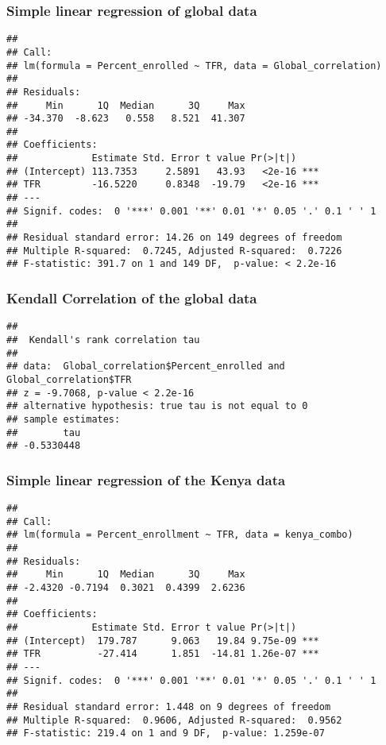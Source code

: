 \documentclass[11pt,]{article}
\begin{document}
\subsubsection{Simple linear regression of global
data}\label{simple-linear-regression-of-global-data-1}

\begin{verbatim}
## 
## Call:
## lm(formula = Percent_enrolled ~ TFR, data = Global_correlation)
## 
## Residuals:
##     Min      1Q  Median      3Q     Max 
## -34.370  -8.623   0.558   8.521  41.307 
## 
## Coefficients:
##             Estimate Std. Error t value Pr(>|t|)    
## (Intercept) 113.7353     2.5891   43.93   <2e-16 ***
## TFR         -16.5220     0.8348  -19.79   <2e-16 ***
## ---
## Signif. codes:  0 '***' 0.001 '**' 0.01 '*' 0.05 '.' 0.1 ' ' 1
## 
## Residual standard error: 14.26 on 149 degrees of freedom
## Multiple R-squared:  0.7245, Adjusted R-squared:  0.7226 
## F-statistic: 391.7 on 1 and 149 DF,  p-value: < 2.2e-16
\end{verbatim}

\subsubsection{Kendall Correlation of the global
data}\label{kendall-correlation-of-the-global-data-1}

\begin{verbatim}
## 
##  Kendall's rank correlation tau
## 
## data:  Global_correlation$Percent_enrolled and Global_correlation$TFR
## z = -9.7068, p-value < 2.2e-16
## alternative hypothesis: true tau is not equal to 0
## sample estimates:
##        tau 
## -0.5330448
\end{verbatim}

\subsubsection{Simple linear regression of the Kenya
data}\label{simple-linear-regression-of-the-kenya-data-1}

\begin{verbatim}
## 
## Call:
## lm(formula = Percent_enrollment ~ TFR, data = kenya_combo)
## 
## Residuals:
##     Min      1Q  Median      3Q     Max 
## -2.4320 -0.7194  0.3021  0.4399  2.6236 
## 
## Coefficients:
##             Estimate Std. Error t value Pr(>|t|)    
## (Intercept)  179.787      9.063   19.84 9.75e-09 ***
## TFR          -27.414      1.851  -14.81 1.26e-07 ***
## ---
## Signif. codes:  0 '***' 0.001 '**' 0.01 '*' 0.05 '.' 0.1 ' ' 1
## 
## Residual standard error: 1.448 on 9 degrees of freedom
## Multiple R-squared:  0.9606, Adjusted R-squared:  0.9562 
## F-statistic: 219.4 on 1 and 9 DF,  p-value: 1.259e-07
\end{verbatim}
\end{document}
